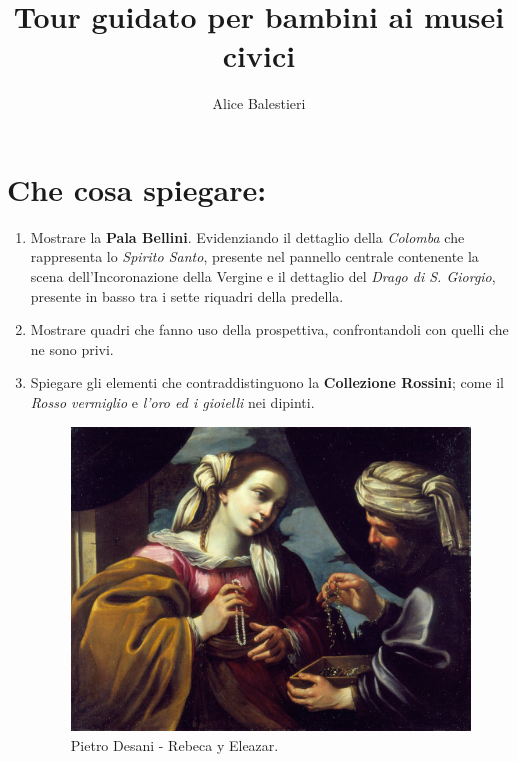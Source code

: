 \documentclass[12pt,a4paper]{article}
\begin{document}
\title{\textbf{Tour guidato per bambini ai musei civici}}
\author{Alice Balestieri}
\date{}

\maketitle
\newpage

\section{Che cosa spiegare:}

	\begin{enumerate}
		
	\item Mostrare la \textbf{Pala Bellini}. Evidenziando il dettaglio della \textit{Colomba} che rappresenta lo \textit{Spirito Santo}, presente nel pannello centrale contenente la scena dell'Incoronazione della Vergine e il dettaglio del \textit{Drago di S. Giorgio}, presente in basso tra i sette riquadri della predella.
	\item Mostrare quadri che fanno uso della prospettiva, confrontandoli con quelli che ne sono privi.  
	\item Spiegare gli elementi che contraddistinguono la \textbf{Collezione Rossini}; come il \textit{Rosso vermiglio} e \textit{l'oro ed i gioielli} nei dipinti.
	\begin{figure}[h]
		\centering
		\includegraphics[scale = 0.05]{Pietro_Desani_Rebeca_y_Eleazar.jpg}
		\caption{Pietro Desani - Rebeca y Eleazar.}
	\end{figure}
	

\end{enumerate}
\end{document}
